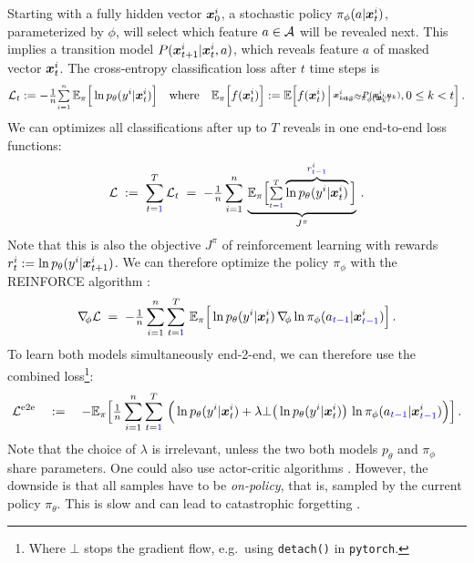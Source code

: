 Starting with a fully hidden vector $\bm x^i_0$, 
a stochastic policy $\pi_\phi(a|\bm x^i_t)$, parameterized by $\phi$,
will select which feature $a \in \mathcal{A}$ will be revealed next.
This implies a transition model $P(\bm x^i_{t+1}|\bm x^i_{t}, a)$, 
which reveals feature $a$ of masked vector $\bm x^i_t$.
The cross-entropy classification loss after $t$ time steps is
$$
	\Set L_t := -\smallfrac{1}{n} \smallsum{i=1}{n}\,  
	\E_\pi\Big[ \ln p_\theta(y^i|\ve x^i_t) \Big]
	\quad \text{where} \quad
	\E_\pi\Big[f(\ve x^i_t)\Big] := \E\Big[ f(\ve x^i_t) \,\Big|
		\stack{
		a_k \sim \pi_\phi(\ve x_k^i)
		\brs[-5mm]
		\ve x^i_{k+1} \sim P(\ve x^i_k, a_k)
		}\!, 0 \leq k < t
	\Big] \,.
$$ 
We can optimizes all classifications after up to $T$ reveals 
in one end-to-end loss functions:
$$ 
	\mathcal{L} \;:=\; \sum_{t={\color{blue}1}}^T \mathcal{L}_t \;=\; 
	-{\textstyle \frac{1}{n}} \sum_{i=1}^{n}\,  
	\underbrace{\mathbb{E}_\pi\Big[ {\textstyle \sum\limits_{\scriptscriptstyle t={\color{blue}1}}^{\scriptscriptstyle T}} 
		\overbrace{\ln p_\theta(y^i| \bm x^i_t)}^{r^i_{\color{blue}t-1}} 
	\Big]}_{J^\pi} \,.
$$
Note that this is also the objective $J^\pi$ of reinforcement learning
with rewards $r^i_t := \ln p_\theta(y^i|\bm x^i_{t+1})$.
We can therefore optimize the policy $\pi_\phi$
with the REINFORCE algorithm \citep{Williams92}:
$$
	\nabla\kern-0.5ex_{\phi} \mathcal{L} \;=\; 
	-{\textstyle \frac{1}{n}} \sum_{i=1}^{n} \sum_{t={\color{blue}1}}^{T}\,  
	\mathbb{E}_\pi\Big[ 
		\ln p_\theta(y^i| \bm x^i_t)  \,
		\nabla\kern-0.5ex_{\phi} \ln \pi_\phi(a_{\color{blue}t-1}| \bm x^i_{\color{blue}t-1}) \Big] \,.
$$
To learn both models simultaneously end-2-end, we can therefore use the 
combined loss\footnote{Where $\bot$ stops the gradient flow,
	e.g.~using \texttt{detach()} in \texttt{pytorch}.}:
$$
	\mathcal{L}^\text{e2e} \quad:=\quad
	- \mathbb{E}_\pi\Big[
	{\textstyle \frac{1}{n}} \sum_{i=1}^{n} \sum_{t={\color{blue}1}}^{T}\,  \Big(
	 \ln p_\theta(y^i| \bm x^i_t) 
	+ \lambda \bot\big(\ln p_\theta(y^i| \bm x^i_t)\big)  \,
		\ln \pi_\phi(a_{\color{blue}t-1}| \bm x^i_{\color{blue}t-1}) \Big) \Big]\,.	
$$
Note that the choice of $\lambda$ is irrelevant, 
unless the two both models $p_\theta$ and $\pi_\phi$ share parameters.
One could also use actor-critic algorithms \citep{Sutton00}.
However, the downside is that all samples have to be 
{\em on-policy}, that is, sampled by the current policy $\pi_\theta$.
This is slow and can lead to catastrophic forgetting
\citep[which can be counteracted by modern 
algorithms,][but this is another story]{Schulman15, Schulman17}.


